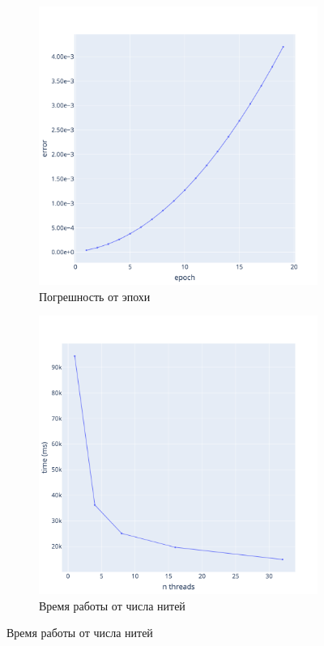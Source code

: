 \documentclass[a4paper,hidelinks,12pt]{article}
\begin{document}
\begin{figure}[H]
\begin{subfigure}{.5\textwidth}
  \centering
  \includegraphics[width=\linewidth]{pictures/L1_256_err.png}
  \caption{Погрешность от эпохи}
\end{subfigure}%
\begin{subfigure}{.5\textwidth}
  \centering
  \includegraphics[width=\linewidth]{pictures/L1_256_time_threads.png}
  \caption{Время работы от числа нитей}
\end{subfigure}%
\end{figure}
\end{document}
